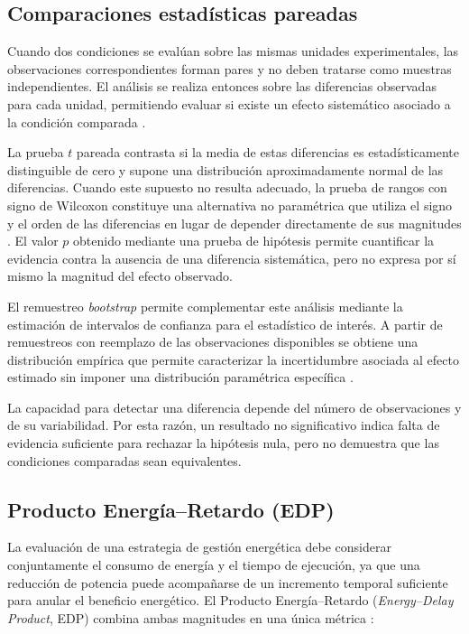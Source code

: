 \subsection{Comparaciones estadísticas pareadas}
\label{sec:marco-pruebas-estadisticas}

Cuando dos condiciones se evalúan sobre las mismas unidades experimentales,
las observaciones correspondientes forman pares y no deben tratarse como
muestras independientes. El análisis se realiza entonces sobre las diferencias
observadas para cada unidad, permitiendo evaluar si existe un efecto sistemático
asociado a la condición comparada \cite[Ch.~2]{Montgomery2017}.

La prueba $t$ pareada contrasta si la media de estas diferencias es
estadísticamente distinguible de cero y supone una distribución aproximadamente
normal de las diferencias. Cuando este supuesto no resulta adecuado, la prueba
de rangos con signo de Wilcoxon constituye una alternativa no paramétrica que
utiliza el signo y el orden de las diferencias en lugar de depender
directamente de sus magnitudes \cite[Ch.~3]{Hollander2014}. El valor $p$
obtenido mediante una prueba de hipótesis permite cuantificar la evidencia
contra la ausencia de una diferencia sistemática, pero no expresa por sí mismo
la magnitud del efecto observado.

El remuestreo \textit{bootstrap} permite complementar este análisis mediante
la estimación de intervalos de confianza para el estadístico de interés. A
partir de remuestreos con reemplazo de las observaciones disponibles se obtiene
una distribución empírica que permite caracterizar la incertidumbre asociada
al efecto estimado sin imponer una distribución paramétrica específica
\cite[Chs.~12--14]{EfronTibshirani1993}.

La capacidad para detectar una diferencia depende del número de observaciones
y de su variabilidad. Por esta razón, un resultado no significativo indica
falta de evidencia suficiente para rechazar la hipótesis nula, pero no demuestra
que las condiciones comparadas sean equivalentes.

\subsection{Producto Energía--Retardo (EDP)}
\label{sec:marco-edp}

La evaluación de una estrategia de gestión energética debe considerar
conjuntamente el consumo de energía y el tiempo de ejecución, ya que una
reducción de potencia puede acompañarse de un incremento temporal suficiente
para anular el beneficio energético. El Producto Energía--Retardo
(\textit{Energy--Delay Product}, EDP) combina ambas magnitudes en una única
métrica \cite{Laros2013}:

